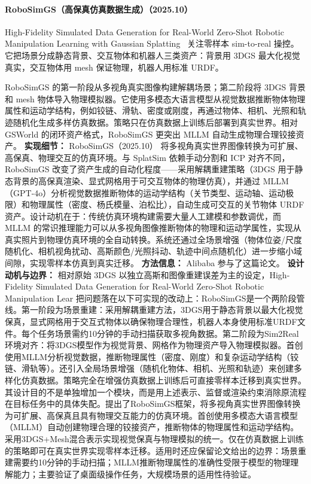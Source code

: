 \paragraph{RoboSimGS（高保真仿真数据生成）（2025.10）}
High-Fidelity Simulated Data Generation for Real-World Zero-Shot Robotic Manipulation Learning with Gaussian Splatting~\cite{2510_10637} 关注零样本 sim-to-real 操控。它把场景分成静态背景、交互物体和机器人三类资产：背景用 3DGS 最大化视觉真实，交互物体用 mesh 保证物理，机器人用标准 URDF。

RoboSimGS 的第一阶段从多视角真实图像构建解耦场景；第二阶段将 3DGS 背景和 mesh 物体导入物理模拟器。它使用多模态大语言模型从视觉数据推断物体物理属性和运动学结构，例如铰链、滑轨、密度或刚度，再通过物体、相机、光照和轨迹随机化生成多样仿真数据。策略只在仿真数据上训练后部署到真实世界。相对 GSWorld 的闭环资产格式，RoboSimGS 更突出 MLLM 自动生成物理合理铰接资产。
\textbf{实现细节：} RoboSimGS（2025.10） 将多视角真实世界图像转换为可扩展、高保真、物理交互的仿真环境。与 SplatSim 依赖手动分割和 ICP 对齐不同，RoboSimGS 改变了资产生成的自动化程度——采用解耦重建策略（3DGS 用于静态背景的高保真渲染、显式网格用于可交互物体的物理仿真），并通过 MLLM（GPT-4o）分析视觉数据推断物体的运动学结构（关节类型、运动轴、运动极限）和物理属性（密度、杨氏模量、泊松比），自动生成可交互的关节物体 URDF 资产。设计动机在于：传统仿真环境构建需要大量人工建模和参数调优，而 MLLM 的常识推理能力可以从多视角图像推断物体的物理和运动学属性，实现从真实照片到物理仿真环境的全自动转换。系统还通过全场景增强（物体位姿/尺度随机化、相机视角扰动、高斯颜色/光照抖动、轨迹中间点随机化）进一步缩小域间隙，实现零样本仿真到真实迁移。
\textbf{方法信息：} Alibaba 参与了这篇论文。
\textbf{设计动机与边界：} 相对原始 3DGS 以独立高斯和图像重建误差为主的设定，High-Fidelity Simulated Data Generation for Real-World Zero-Shot Robotic Manipulation Lear 把问题落在以下可实现的改动上：RoboSimGS是一个两阶段管线。第一阶段为场景重建：采用解耦重建方法，3DGS用于静态背景以最大化视觉保真，显式网格用于交互式物体以确保物理合理性，机器人本身使用标准URDF文件。每个任务场景需约10分钟的手动扫描获取多视角数据。第二阶段为Sim2Real环境对齐：将3DGS模型作为视觉背景、网格作为物理资产导入物理模拟器。首创使用MLLM分析视觉数据，推断物理属性（密度、刚度）和复杂运动学结构（铰链、滑轨等）。还引入全局场景增强（随机化物体、相机、光照和轨迹）来创建多样化仿真数据。策略完全在增强仿真数据上训练后可直接零样本迁移到真实世界。其设计目的不是单独增加一个模块，而是用上述表示、监督或渲染约束消除原流程在目标任务中的具体失配。提出了RoboSimGS框架，将多视角真实世界图像转换为可扩展、高保真且具有物理交互能力的仿真环境。首创使用多模态大语言模型（MLLM）自动创建物理合理的铰接资产，推断物体的物理属性和运动学结构。采用3DGS+Mesh混合表示实现视觉保真与物理模拟的统一。仅在仿真数据上训练的策略即可在真实世界实现零样本迁移。适用时还应保留论文给出的边界：场景重建需要约10分钟的手动扫描；MLLM推断物理属性的准确性受限于模型的物理理解能力；主要验证了桌面级操作任务，大规模场景的适用性待验证。
